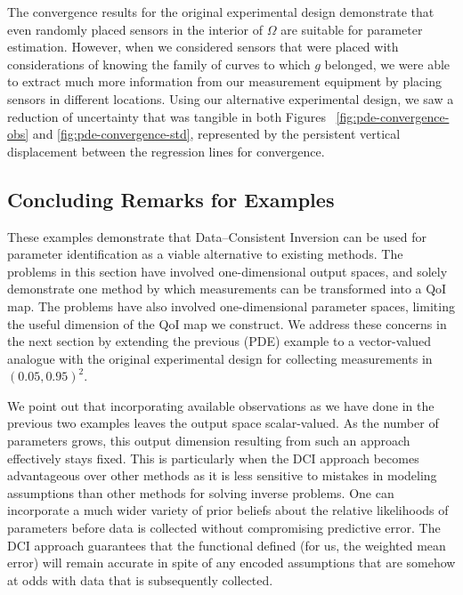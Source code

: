 The convergence results for the original experimental design demonstrate that even randomly placed sensors in the interior of $\Omega$ are suitable for parameter estimation.
However, when we considered sensors that were placed with considerations of knowing the family of curves to which $g$ belonged, we were able to extract much more information from our measurement equipment by placing sensors in different locations.
Using our alternative experimental design, we saw a reduction of uncertainty that was tangible in both Figures~ \ref{fig:pde-convergence-obs} and \ref{fig:pde-convergence-std}, represented by the persistent vertical displacement between the regression lines for convergence.


\FloatBarrier
\subsection{Concluding Remarks for Examples}

These examples demonstrate that Data--Consistent Inversion can be used for parameter identification as a viable alternative to existing methods.
The problems in this section have involved one-dimensional output spaces, and solely demonstrate one method by which measurements can be transformed into a QoI map.
The problems have also involved one-dimensional parameter spaces, limiting the useful dimension of the QoI map we construct.
We address these concerns in the next section by extending the previous (PDE) example to a vector-valued analogue with the original experimental design for collecting measurements in $(0.05, 0.95)^2$.

We point out that incorporating available observations as we have done in the previous two examples leaves the output space scalar-valued.
As the number of parameters grows, this output dimension resulting from such an approach effectively stays fixed.
This is particularly when the DCI approach becomes advantageous over other methods as it is less sensitive to mistakes in modeling assumptions than other methods for solving inverse problems.
One can incorporate a much wider variety of prior beliefs about the relative likelihoods of parameters before data is collected without compromising predictive error.
The DCI approach guarantees that the functional defined (for us, the weighted mean error) will remain accurate in spite of any encoded assumptions that are somehow at odds with data that is subsequently collected.
